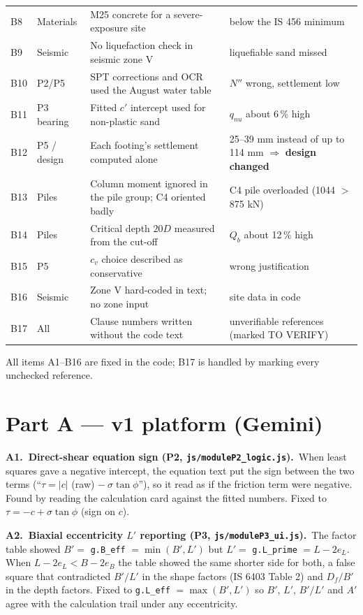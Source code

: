 \documentclass[11pt,a4paper]{article}
\newcommand{\code}[1]{\texttt{\small #1}}
\newcommand{\auditem}[3]{\par\medskip\textbf{\color{accent}#1.\ #2.}\ #3\par}
\begin{document}
{\begin{longtable}{@{}p{}p{}p{}p{}@{}}
B8 & Materials & M25 concrete for a severe-exposure site & below the IS 456 minimum \\
B9 & Seismic & No liquefaction check in seismic zone V & liquefiable sand missed \\
B10 & P2/P5 & SPT corrections and OCR used the August water table & $N''$ wrong, settlement low \\
B11 & P3 bearing & Fitted $c'$ intercept used for non-plastic sand & $q_{nu}$ about 6\,\% high \\
B12 & P5 / design & Each footing's settlement computed alone & 25--39 mm instead of up to 114 mm $\Rightarrow$ \textbf{design changed} \\
B13 & Piles & Column moment ignored in the pile group; C4 oriented badly & C4 pile overloaded (1044 $>$ 875 kN) \\
B14 & Piles & Critical depth $20D$ measured from the cut-off & $Q_b$ about 12\,\% high \\
B15 & P5 & $c_v$ choice described as conservative & wrong justification \\
B16 & Seismic & Zone V hard-coded in text; no zone input & site data in code \\
B17 & All & Clause numbers written without the code text & unverifiable references (marked TO VERIFY) \\
\bottomrule
\end{longtable}}

All items A1--B16 are fixed in the code; B17 is handled by marking every unchecked reference.

\section{Part A --- v1 platform (Gemini)}

\auditem{A1}{Direct-shear equation sign (P2, \code{js/moduleP2\_logic.js})}{When least squares gave a negative
intercept, the equation text put the sign between the two terms (``$\tau = |c|$ (raw) $-\ \sigma\tan\phi$''), so it
read as if the friction term were negative. Found by reading the calculation card against the fitted numbers. Fixed to
$\tau = -c + \sigma\tan\phi$ (sign on $c$).}

\auditem{A2}{Biaxial eccentricity $L'$ reporting (P3, \code{js/moduleP3\_ui.js})}{The factor table showed
$B' = $ \code{g.B\_eff} $= \min(B', L')$ but $L' = $ \code{g.L\_prime} $= L - 2e_L$. When $L - 2e_L < B - 2e_B$ the table
showed the same shorter side for both, a false square that contradicted $B'/L'$ in the shape factors (IS 6403 Table 2)
and $D_f/B'$ in the depth factors. Fixed to \code{g.L\_eff} $= \max(B', L')$ so $B'$, $L'$, $B'/L'$ and $A'$ agree with
the calculation trail under any eccentricity.}
\end{document}
